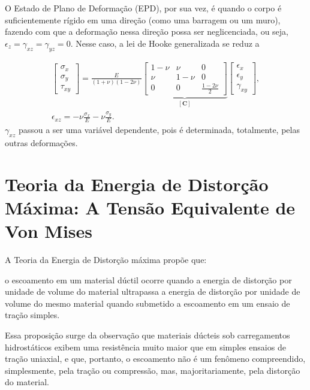 O Estado de Plano de Deformação (EPD), por sua vez, é quando o corpo é suficientemente rígido em uma direção (como uma barragem ou um muro), fazendo com que a deformação nessa direção possa ser neglicenciada, ou seja, $\epsilon_z = \gamma_{xz} = \gamma_{yz} = 0$. Nesse caso, a lei de Hooke generalizada se reduz a

\begin{gather}
    \begin{bmatrix}
        \sigma_x \\
        \sigma_y \\
        \tau_{xy}
    \end{bmatrix} = \frac{E}{(1+\nu)(1-2\nu)} 
    \underbrace{\begin{bmatrix}
        1 - \nu & \nu & 0 \\
        \nu & 1 - \nu & 0 \\
        0 & 0 & \frac{1-2\nu}{2}
    \end{bmatrix}}_{[\bm{C}]}
    \begin{bmatrix}
        \epsilon_x \\
        \epsilon_y \\
        \gamma_{xy}
    \end{bmatrix}, \\
    \epsilon_{xz} = -\nu \frac{\sigma_x}{E} - \nu \frac{\sigma_y}{E}.
\end{gather}
$\gamma_{xz}$ passou a ser uma variável dependente, pois é determinada, totalmente, pelas outras deformações.  \cite[pág. 91]{Zin}



\section{Teoria da Energia de Distorção Máxima: A Tensão Equivalente de Von Mises}

A Teoria da Energia de Distorção máxima propõe que:
\begin{citacao}
    o escoamento em um material dúctil ocorre quando a energia de distorção por unidade de volume do material ultrapassa a energia de distorção por unidade de volume do mesmo material quando submetido a escoamento em um ensaio de tração simples. \cite{Hibbeler}
\end{citacao}

Essa proposição surge da observação que materiais dúcteis sob carregamentos hidrostáticos exibem uma resistência muito maior que em simples ensaios de tração uniaxial, e que, portanto, o escoamento não é um fenômeno compreendido, simplesmente, pela tração ou compressão, mas, majoritariamente, pela distorção do material. \cite{Hibbeler}

